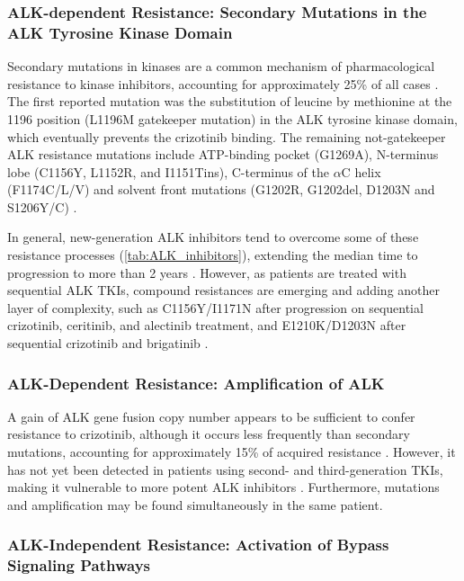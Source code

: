 \subsubsection{ALK-dependent Resistance: Secondary Mutations in the ALK Tyrosine Kinase Domain}

Secondary mutations in kinases are a common mechanism of pharmacological resistance to kinase inhibitors, accounting for approximately 25\% of all cases \cite{Crizotinib_over, TKI_resistance}. The first reported mutation was the substitution of leucine by methionine at the 1196 position (L1196M gatekeeper mutation) in the ALK tyrosine kinase domain, which eventually prevents the crizotinib binding. The remaining not-gatekeeper ALK resistance mutations include ATP-binding pocket (G1269A), N-terminus lobe (C1156Y, L1152R, and I1151Tins), C-terminus of the $\alpha$C helix (F1174C/L/V) and solvent front mutations (G1202R, G1202del, D1203N and S1206Y/C) \cite{ALK_resistance}.

In general, new-generation ALK inhibitors tend to overcome some of these resistance processes (\autoref{tab:ALK_inhibitors}), extending the median time to progression to more than 2 years \cite{EML4_ALK_variants}. However, as patients are treated with sequential ALK TKIs, compound resistances are emerging and adding another layer of complexity, such as C1156Y\slash I1171N after progression on sequential crizotinib, ceritinib, and alectinib treatment, and E1210K\slash D1203N after sequential crizotinib and brigatinib \cite{ALK_resistance}.

\subsubsection{ALK-Dependent Resistance: Amplification of ALK}

A gain of ALK gene fusion copy number appears to be sufficient to confer resistance to crizotinib, although it occurs less frequently than secondary mutations, accounting for approximately 15\% of acquired resistance \cite{TKI_acquired}. However, it has not yet been detected in patients using second- and third-generation TKIs, making it vulnerable to more potent ALK inhibitors \cite{ALK_resistance}. Furthermore, mutations and amplification may be found simultaneously in the same patient.

\subsubsection{ALK-Independent Resistance: Activation of Bypass Signaling Pathways}

